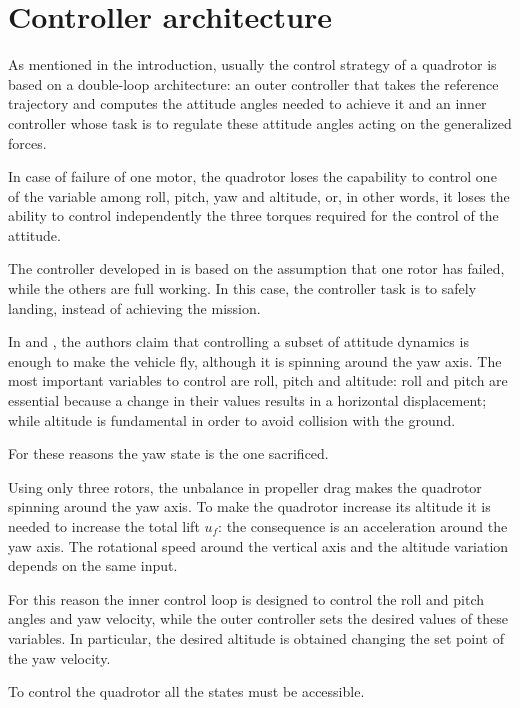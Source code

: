 \documentclass[11pt,a4paper]{scrartcl}
\begin{document}
\section{Controller architecture}

As mentioned in the introduction, usually the control strategy of a quadrotor is based on a double-loop architecture: an outer controller that takes the reference trajectory and computes the attitude angles needed to achieve it and an inner controller whose task is to regulate these attitude angles acting on the generalized forces.

In case of failure of one motor, the quadrotor loses the capability to control one of the variable among roll, pitch, yaw and altitude, or, in other words, it loses the ability to control independently the three torques required for the control of the attitude.

The controller developed in \cite{lanzon2014flight} is based on the assumption that one rotor has failed, while the others are full working. In  this case, the controller task is to safely landing, instead of achieving the mission.

In \cite{lanzon2014flight} and \cite{freddi2011feedback}, the authors claim that controlling a subset of attitude dynamics is enough to make the vehicle fly, although it is spinning around the yaw axis. The most important variables to control are roll, pitch and altitude: roll and pitch are essential because a change in their values results in a horizontal displacement; while altitude is fundamental in order to avoid collision with the ground.

For these reasons the yaw state is the one sacrificed.

Using only three rotors, the unbalance in propeller drag makes the quadrotor spinning around the yaw axis. To make the quadrotor increase its altitude it is needed to increase the total lift $ u_f $: the consequence is an acceleration around the yaw axis. The rotational speed around the vertical axis and the altitude variation depends on the same input. 

For this reason the inner control loop is designed to control the roll and pitch angles and yaw velocity, while the outer controller sets the desired values of these variables. In particular, the desired altitude is obtained changing the set point of the yaw velocity.


To control the quadrotor all the states must be accessible.
\end{document}
